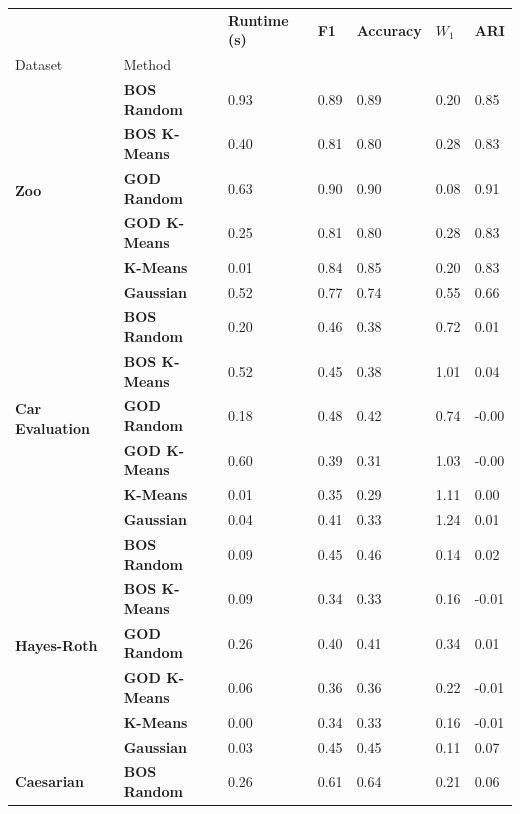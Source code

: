 \begin{table}
\begin{adjustbox}{width=\columnwidth}
\begin{tabular}{lllllll}
\toprule
 &  & \textbf{Runtime (s)} & \textbf{F1} & \textbf{Accuracy} & $W_1$ & \textbf{ARI} \\
Dataset & Method &  &  &  &  &  \\
\midrule
\multirow[t]{6}{*}{\textbf{Zoo}} & \textbf{BOS Random} & 0.93 & 0.89 & 0.89 & 0.20 & 0.85 \\
\textbf{} & \textbf{BOS K-Means} & 0.40 & 0.81 & 0.80 & 0.28 & 0.83 \\
\textbf{} & \textbf{GOD Random} & 0.63 & 0.90 & 0.90 & 0.08 & 0.91 \\
\textbf{} & \textbf{GOD K-Means} & 0.25 & 0.81 & 0.80 & 0.28 & 0.83 \\
\textbf{} & \textbf{K-Means} & 0.01 & 0.84 & 0.85 & 0.20 & 0.83 \\
\textbf{} & \textbf{Gaussian} & 0.52 & 0.77 & 0.74 & 0.55 & 0.66 \\
\cline{1-7}
\multirow[t]{6}{*}{\textbf{Car Evaluation}} & \textbf{BOS Random} & 0.20 & 0.46 & 0.38 & 0.72 & 0.01 \\
\textbf{} & \textbf{BOS K-Means} & 0.52 & 0.45 & 0.38 & 1.01 & 0.04 \\
\textbf{} & \textbf{GOD Random} & 0.18 & 0.48 & 0.42 & 0.74 & -0.00 \\
\textbf{} & \textbf{GOD K-Means} & 0.60 & 0.39 & 0.31 & 1.03 & -0.00 \\
\textbf{} & \textbf{K-Means} & 0.01 & 0.35 & 0.29 & 1.11 & 0.00 \\
\textbf{} & \textbf{Gaussian} & 0.04 & 0.41 & 0.33 & 1.24 & 0.01 \\
\cline{1-7}
\multirow[t]{6}{*}{\textbf{Hayes-Roth}} & \textbf{BOS Random} & 0.09 & 0.45 & 0.46 & 0.14 & 0.02 \\
\textbf{} & \textbf{BOS K-Means} & 0.09 & 0.34 & 0.33 & 0.16 & -0.01 \\
\textbf{} & \textbf{GOD Random} & 0.26 & 0.40 & 0.41 & 0.34 & 0.01 \\
\textbf{} & \textbf{GOD K-Means} & 0.06 & 0.36 & 0.36 & 0.22 & -0.01 \\
\textbf{} & \textbf{K-Means} & 0.00 & 0.34 & 0.33 & 0.16 & -0.01 \\
\textbf{} & \textbf{Gaussian} & 0.03 & 0.45 & 0.45 & 0.11 & 0.07 \\
\cline{1-7}
\multirow[t]{6}{*}{\textbf{Caesarian}} & \textbf{BOS Random} & 0.26 & 0.61 & 0.64 & 0.21 & 0.06 \\

\end{tabular}
\end{adjustbox}
\end{table}
